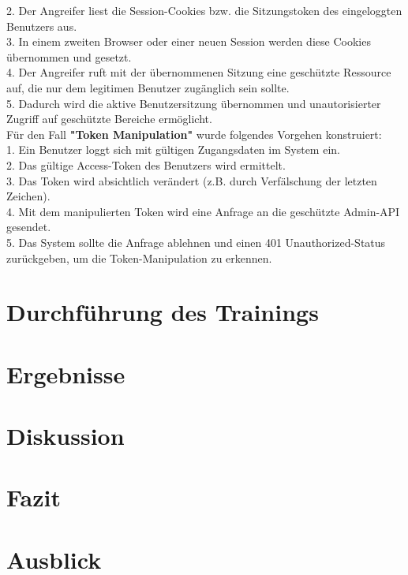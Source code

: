 \documentclass[a4paper,12pt]{article}
\begin{document}
	2. Der Angreifer liest die Session-Cookies bzw. die Sitzungstoken des eingeloggten Benutzers aus.
	\\[0.5em]
	3. In einem zweiten Browser oder einer neuen Session werden diese Cookies übernommen und gesetzt.
	\\[0.5em]
	4. Der Angreifer ruft mit der übernommenen Sitzung eine geschützte Ressource auf, die nur dem legitimen Benutzer zugänglich sein sollte.
	\\[0.5em]
	5. Dadurch wird die aktive Benutzersitzung übernommen und unautorisierter Zugriff auf geschützte Bereiche ermöglicht.
	\\[1.0em]
	Für den Fall \textbf{"Token Manipulation"} wurde folgendes Vorgehen konstruiert:
	\\[0.5em]
	1. Ein Benutzer loggt sich mit gültigen Zugangsdaten im System ein.
	\\[0.5em]
	2. Das gültige Access-Token des Benutzers wird ermittelt.
	\\[0.5em]
	3. Das Token wird absichtlich verändert (z.B. durch Verfälschung der letzten Zeichen).
	\\[0.5em]
	4. Mit dem manipulierten Token wird eine Anfrage an die geschützte Admin-API gesendet.
	\\[0.5em]
	5. Das System sollte die Anfrage ablehnen und einen 401 Unauthorized-Status zurückgeben, um die Token-Manipulation zu erkennen.
	
	\section{Durchführung des Trainings}
	\section{Ergebnisse}
	\section{Diskussion}
	\section{Fazit}
	\section{Ausblick}
\newpage	

 
\newpage 
\renewcommand{\notesname}{Fußnotenverzeichnis}
\renewcommand{\enoteformat}{\rightskip0pt\leftskip0pt\vspace{0.5em}\noindent\makebox[2em][l]{\theenmark}}
\theendnotes
\end{document}
